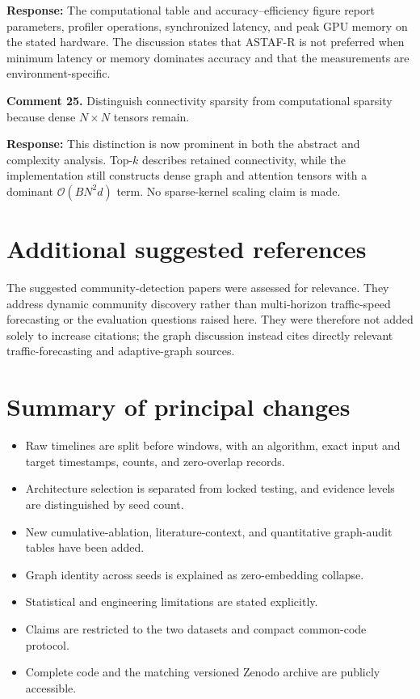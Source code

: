 \documentclass[11pt]{article}
\newcommand{\response}[1]{\par\noindent\textcolor{responseblue}{\textbf{Response:} #1}\par}
\begin{document}
\response{The computational table and accuracy--efficiency figure report parameters, profiler operations, synchronized latency, and peak GPU memory on the stated hardware. The discussion states that ASTAF-R is not preferred when minimum latency or memory dominates accuracy and that the measurements are environment-specific.}

\textbf{Comment 25.} Distinguish connectivity sparsity from computational sparsity because dense $N\times N$ tensors remain.

\response{This distinction is now prominent in both the abstract and complexity analysis. Top-$k$ describes retained connectivity, while the implementation still constructs dense graph and attention tensors with a dominant $\mathcal{O}(BN^2d)$ term. No sparse-kernel scaling claim is made.}

\section*{Additional suggested references}
The suggested community-detection papers were assessed for relevance. They address dynamic community discovery rather than multi-horizon traffic-speed forecasting or the evaluation questions raised here. They were therefore not added solely to increase citations; the graph discussion instead cites directly relevant traffic-forecasting and adaptive-graph sources.

\section*{Summary of principal changes}
\begin{itemize}
\item Raw timelines are split before windows, with an algorithm, exact input and target timestamps, counts, and zero-overlap records.
\item Architecture selection is separated from locked testing, and evidence levels are distinguished by seed count.
\item New cumulative-ablation, literature-context, and quantitative graph-audit tables have been added.
\item Graph identity across seeds is explained as zero-embedding collapse.
\item Statistical and engineering limitations are stated explicitly.
\item Claims are restricted to the two datasets and compact common-code protocol.
\item Complete code and the matching versioned Zenodo archive are publicly accessible.
\end{itemize}
\end{document}
